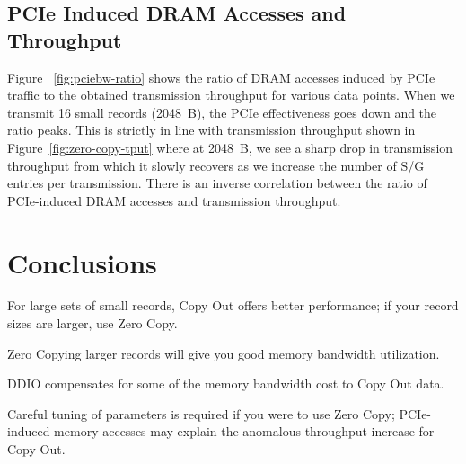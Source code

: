 \subsection{PCIe Induced DRAM Accesses and Throughput}
Figure ~\ref{fig:pciebw-ratio} shows the ratio of DRAM accesses induced by PCIe traffic to the obtained transmission throughput for various data points. When we transmit 16 small records (2048~B),
the PCIe effectiveness goes down and the ratio peaks. This is strictly in line with transmission throughput shown in Figure~\ref{fig:zero-copy-tput} where at 2048~B, we see a sharp drop in transmission 
throughput from which it slowly recovers as we increase the number of S/G entries per transmission. There is an inverse correlation between the ratio of PCIe-induced DRAM accesses and transmission throughput.
\newline


\section{Conclusions}
\begin{myitemize}
\setlength\itemsep{0.5em}
\item For large sets of small records, Copy Out offers better performance; if your record sizes are larger, use Zero Copy.
\item Zero Copying larger records will give you good memory bandwidth utilization.
\item DDIO compensates for some of the memory bandwidth cost to Copy Out data.
\item Careful tuning of parameters is required if you were to use Zero Copy; PCIe-induced memory accesses may explain the anomalous throughput increase for Copy Out. 
\end{myitemize}














